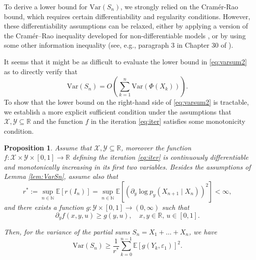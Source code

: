 \documentclass[a4paper,10pt]{article}
\newtheorem{proposition}[theorem]{Proposition}
\newcommand{\N}{\mathbb{N}}
\newcommand{\R}{\mathbb{R}}
\newcommand{\X}{\mathcal{X}}
\newcommand{\Y}{\mathcal{Y}}
\newcommand{\E}{\mathbb{E}}
\newcommand{\eps}{\varepsilon}
\newcommand{\var}{\mathrm{Var}}
\begin{document}
To derive a lower bound for $\var(S_n)$, we strongly relied on the Cram\'er-Rao bound, which requires certain differentiability and regularity conditions. However, these differentiability assumptions can be relaxed, either by applying a version of the Cramér–Rao inequality developed for non-differentiable models \cite{cramer_nondiff}, or by using some other information inequality (see, e.g., paragraph 3 in Chapter 30 of \cite{BorovkovCramer}).

It seems that it might be as difficult to evaluate the lower bound in \eqref{eq:varsum2} as to directly verify that
\[
\var(S_n) = O\left(\sum_{k=1}^n \var(\Phi(X_k))\right).
\]
To show that the lower bound on the right-hand side of \eqref{eq:varsum2} is tractable, we establish a more explicit sufficient condition under the assumptions that $\X, \Y \subseteq \R$ and the function $f$ in the iteration \eqref{eq:iter} satisfies some monotonicity condition.
\begin{proposition}\label{prop2}
	Assume that $\X, \Y \subseteq \R$, moreover the function $f:\X \times \Y \times [0,1] \to \R$ defining the iteration \eqref{eq:iter} is continuously differentiable and monotonically increasing in its first two variables. Besides the assumptions of Lemma \ref{lem:VarSn}, assume also that
	\begin{equation}\label{eq:spectral_cond}
		r^* := \sup_{n \in \N} \E \left[r(I_n)\right] = \sup_{n \in \N} \E \left[\left(\partial_y \log p_y (X_{n+1} \mid X_n)\right)^2\right] < \infty,
	\end{equation}
	and there exists a function $g: \Y \times [0,1] \to (0, \infty)$ such that
	\[
	\partial_y f(x, y, u) \ge g(y, u), \quad x, y \in \R,\, u \in [0,1].
	\]
	
	Then, for the variance of the partial sums $S_n = X_1 + \ldots + X_n$, we have
	\[
	\var(S_n) \ge \frac{1}{r^*} \sum_{k=0}^{n-1} \E \left[g(Y_k, \eps_1)\right]^2.
	\]
\end{proposition}
\end{document}
